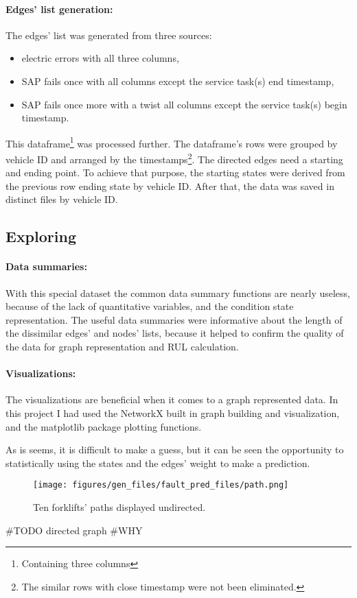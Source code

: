 \paragraph{Edges' list generation:}
The edges' list was generated from three sources: 
\begin{itemize}
	\item{electric errors} with all three columns,
	\item{SAP fails once} with all columns except the service task(s) end timestamp,
	\item{SAP fails once more with a twist} all columns except the service task(s) begin timestamp.
\end{itemize}

This dataframe\footnote{Containing three columns} was processed further. The dataframe's rows were grouped by vehicle ID and arranged by the timestamps\footnote{The similar rows with close timestamp were not been eliminated.}.
The directed edges need a starting and ending point. To achieve that purpose, the starting states were derived from the previous row ending state by vehicle ID. After that, the data was saved in distinct files by vehicle ID.
	\subsection{Exploring}
		\paragraph{Data summaries:}
		With this special dataset the common data summary functions are nearly useless, because of the lack of quantitative variables, and the condition state representation.
		The useful data summaries were informative about the length of the dissimilar edges' and nodes' lists, because it helped to confirm the quality of the data for graph representation and RUL calculation. 

		\paragraph{Visualizations:}
		The visualizations are beneficial when it comes to a graph represented data. In this project I had used the NetworkX built in graph building and visualization, and the matplotlib package plotting functions.

		As is seems, it is difficult to make a guess, but it can be seen the opportunity to statistically using the states and the edges' weight to make a prediction.
			\begin{figure}[H]
			\centering
			\texttt{[image: figures/gen\_files/fault\_pred\_files/path.png]}
			\caption{Ten forklifts' paths displayed undirected.} 
			\end{figure}
		\#TODO directed graph
\#WHY
